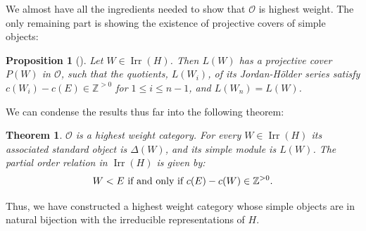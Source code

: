 \documentclass{amsart}
\newtheorem{teo}[defi]{ Theorem}
\newtheorem{prop}[defi]{ Proposition}
\newcommand{\OX}{\mathcal{O}}
\begin{document}
We almost have all the ingredients needed to show that $\OX$ is highest weight. The only remaining part is showing the existence of projective covers of simple objects:
\begin{prop}[{\cite[Corollary 2.10.]{ginzburg2003category}}]
Let $W\in \operatorname{Irr}(H)$. Then  $L(W)$ has a projective cover
$P(W)$ in  $\OX$,  such that the quotients, $L(W_i)$, of its Jordan-Hölder series satisfy  $c(W_i)-c(E)\in \mathbb{Z}^{>0}$ for $1\leq i\leq n-1$, and $L(W_n)=L(W)$.
\end{prop}
We can condense the results thus far into the following theorem:
\begin{teo}
$\OX$ is a highest weight category. For every $W\in \operatorname{Irr}(H)$
its associated standard object is $\Delta(W)$, and  its simple module is $L(W)$. The partial order relation in $\operatorname{Irr}(H)$ is given by:
\begin{equation*}
    W<E \textnormal{ if and only if }  c(E)-c(W)\in \mathbb{Z}^{> 0}.
\end{equation*}
\end{teo}
Thus, we have constructed a highest weight category whose simple objects are in natural bijection with the irreducible representations of $H$. 
\end{document}
